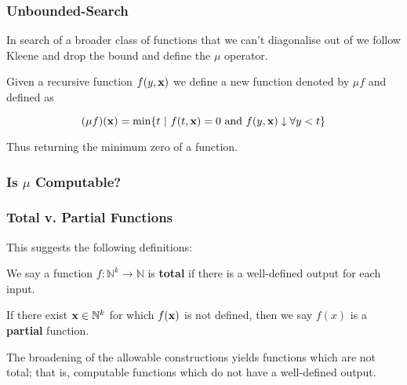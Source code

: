 \documentclass{beamer}
\begin{document}
\begin{frame}
	\frametitle{Unbounded-Search}

	In search of a broader class of functions that we can't diagonalise out of we follow Kleene and drop the bound and define the $\mu$ operator. 

	\vspace{0.5cm}

	Given a recursive function $f(y,{\bf x})$ we define a new function denoted by $\mu f$ and defined as

	$$(\mu f)({\bf x}) = \text{min}\{t \ | \ f(t,{\bf x}) = 0 \text{ and } f(y,{\bf x}) \downarrow \forall y < t \} $$

	Thus returning the minimum zero of a function.
\end{frame}

\begin{frame}
	\frametitle{Is $\mu$ Computable?}


\end{frame}

\begin{frame}
	\frametitle{Total v. Partial Functions}

	This suggests the following definitions: 

	\vspace{0.5cm}

	We say a function $f:\mathbb{N}^{k} \rightarrow \mathbb{N}$ is {\bf total} if there is a well-defined output for each input. 

	\vspace{0.5cm}

	If there exist ${\bf x} \in \mathbb{N}^{k}$ for which $f({\bf x})$ is not defined, then we say $f(x)$ is a {\bf partial} function.

	\vspace{0.5cm}

	The broadening of the allowable constructions yields functions which are not total; that is, computable functions which do not have a well-defined output. 


\end{frame}
\end{document}
